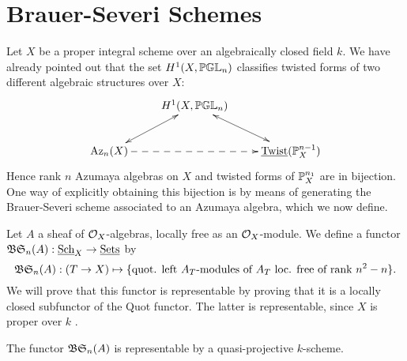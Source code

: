 \section{Brauer-Severi Schemes}
Let $X$ be a proper integral scheme over an algebraically closed field $k$.  We have already pointed out that the set $H^1(X,\mathbb{PGL}_n)$ classifies twisted forms of two different algebraic structures over $X$:
$$\xymatrix{
& \ar@{<->}[dl]H^1(X,\bbpgl_n) \ar@{<->}[dr]&\\
\Az_n(X)\ar@{-->}[rr] & & \twist(\bbp_X^{n-1})
}$$
Hence rank $n$ Azumaya algebras on $X$ and twisted forms of $\mathbb{P}^{n_1}_X$ are in bijection.  One way of explicitly obtaining this bijection is by means of generating the Brauer-Severi scheme associated to an Azumaya algebra, which we now define.

Let $A$ a sheaf of $\mathcal{O}_X$-algebras, locally free as an $\mathcal{O}_X$-module.  We define a functor $\mathfrak{BS}_n(A): \textnormal{\underline{Sch}}_X\rightarrow \textnormal{\underline{Sets}}$ by
$$\mathfrak{BS}_n(A): (T\rightarrow X)\mapsto \{\text{quot. left $A_T$-modules of $A_T$ loc. free of rank $n^2-n$}\}.$$
We will prove that this functor is representable by proving that it is a locally closed subfunctor of the Quot functor.  The latter is representable, since $X$ is proper over $k$ \cite{nitsure2005construction}.
\begin{lem}
The functor $\mathfrak{BS}_n(A)$ is representable by a quasi-projective $k$-scheme.
\end{lem}
